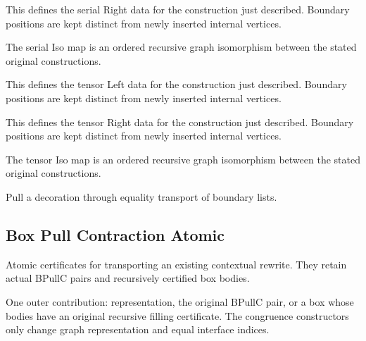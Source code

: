 This defines the serial Right data for the construction just described. Boundary positions are kept distinct from newly inserted internal vertices.
\par{}

The serial Iso map is an ordered recursive graph isomorphism between the stated original constructions.
\par{}

This defines the tensor Left data for the construction just described. Boundary positions are kept distinct from newly inserted internal vertices.
\par{}

This defines the tensor Right data for the construction just described. Boundary positions are kept distinct from newly inserted internal vertices.
\par{}

The tensor Iso map is an ordered recursive graph isomorphism between the stated original constructions.
\par{}

Pull a decoration through equality transport of boundary lists.
\par{}

\subsection{Box Pull Contraction Atomic}
Atomic certificates for transporting an existing contextual rewrite. They retain actual BPullC pairs and recursively certified box bodies.

One outer contribution: representation, the original BPullC pair, or a box whose bodies have an original recursive filling certificate. The congruence constructors only change graph representation and equal interface indices.
\par{}

